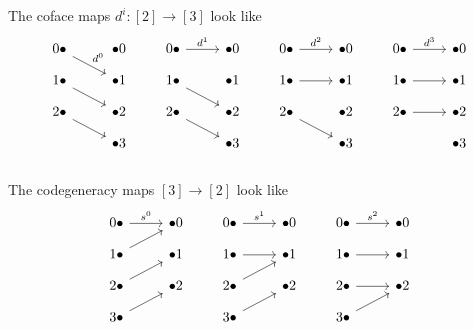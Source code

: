 \documentclass[11pt,openany]{book}
\begin{document}
\begin{example} The coface maps $d^i \colon [2] \to [3]$ look like
\[ \begin{tikzcd}[row sep=small]
    0\bullet\ar[dr,"d^0" above right] & \bullet 0\\
    1\bullet\ar[dr] & \bullet1\\
    2\bullet\ar[dr] & \bullet2\\
    & \bullet3\\
\end{tikzcd} \qquad \begin{tikzcd}[row sep=small]
    0\bullet\rar["d^1" above] & \bullet 0\\
    1\bullet\ar[dr] & \bullet1\\
    2\bullet\ar[dr] & \bullet2\\
    & \bullet3\\
\end{tikzcd} \qquad \begin{tikzcd}[row sep=small]
    0\bullet\rar["d^2" above] & \bullet 0\\
    1\bullet\rar & \bullet1\\
    2\bullet\ar[dr] & \bullet2\\
    & \bullet3\\
\end{tikzcd} \qquad \begin{tikzcd}[row sep=small]
    0\bullet\rar["d^3" above] & \bullet 0\\
    1\bullet\rar & \bullet1\\
    2\bullet\rar & \bullet2\\
    & \bullet3\\
\end{tikzcd} \]
\end{example}
\begin{example} The codegeneracy maps $[3] \to [2]$ look like
\[ \begin{tikzcd}[row sep=small]
    0\bullet\rar["s^0" above] & \bullet 0\\
    1\bullet\ar[ur] & \bullet1\\
    2\bullet\ar[ur] & \bullet2\\
    3\bullet\ar[ur]& \\
\end{tikzcd} \qquad
\begin{tikzcd}[row sep=small]
    0\bullet\rar["s^1" above] & \bullet 0\\
    1\bullet\rar & \bullet1\\
    2\bullet\ar[ur] & \bullet2\\
    3\bullet\ar[ur]& \\
\end{tikzcd} \qquad 
\begin{tikzcd}[row sep=small]
    0\bullet\rar["s^2" above] & \bullet 0\\
    1\bullet\rar & \bullet1\\
    2\bullet\rar & \bullet2\\
    3\bullet\ar[ur]& \\
\end{tikzcd} \]
\end{example}
\end{document}
